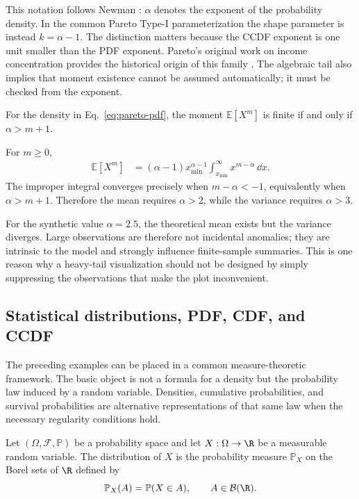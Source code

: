 This notation follows Newman \cite{Newman2005}: $\alpha$ denotes the exponent of the probability density. In the common Pareto Type-I parameterization the shape parameter is instead $k=\alpha-1$. The distinction matters because the CCDF exponent is one unit smaller than the PDF exponent. Pareto's original work on income concentration provides the historical origin of this family \cite{Pareto1896}. The algebraic tail also implies that moment existence cannot be assumed automatically; it must be checked from the exponent.

\begin{proposition}
For the density in Eq.~\eqref{eq:pareto-pdf}, the moment $\mathbb{E}[X^m]$ is finite if and only if $\alpha>m+1$.
\end{proposition}

\begin{demonstration}
For $m\geq0$,
\begin{align}
\mathbb{E}[X^m]
&=(\alpha-1)x_{\min}^{\alpha-1}
\int_{x_{\min}}^{\infty}x^{m-\alpha}\,\dd x.
\end{align}
The improper integral converges precisely when $m-\alpha<-1$, equivalently when $\alpha>m+1$. Therefore the mean requires $\alpha>2$, while the variance requires $\alpha>3$.
\end{demonstration}

For the synthetic value $\alpha=2.5$, the theoretical mean exists but the variance diverges. Large observations are therefore not incidental anomalies; they are intrinsic to the model and strongly influence finite-sample summaries. This is one reason why a heavy-tail visualization should not be designed by simply suppressing the observations that make the plot inconvenient.

\subsection{Statistical distributions, PDF, CDF, and CCDF}

The preceding examples can be placed in a common measure-theoretic framework. The basic object is not a formula for a density but the probability law induced by a random variable. Densities, cumulative probabilities, and survival probabilities are alternative representations of that same law when the necessary regularity conditions hold.

\begin{definition}
Let $(\Omega,\mathcal{F},\mathbb{P})$ be a probability space and let $X:\Omega\rightarrow\R$ be a measurable random variable. The distribution of $X$ is the probability measure $\mathbb{P}_X$ on the Borel sets of $\R$ defined by
\begin{equation}
 \mathbb{P}_X(A)=\mathbb{P}(X\in A),
 \qquad A\in\mathcal{B}(\R).
\end{equation}
\end{definition}

